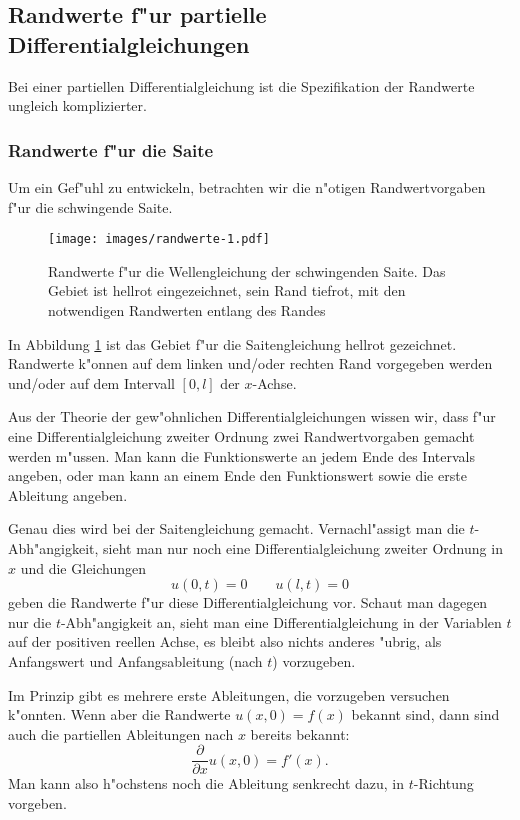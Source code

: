 \subsection{Randwerte f"ur partielle Differentialgleichungen\label{klassifikation:randwerte-pde}}
Bei einer partiellen Differentialgleichung ist die Spezifikation
der Randwerte ungleich komplizierter.
\subsubsection{Randwerte f"ur die Saite}
Um ein Gef"uhl zu entwickeln, betrachten wir die n"otigen
Randwertvorgaben f"ur die schwingende Saite.
\begin{figure}
\begin{center}
\texttt{[image: images/randwerte-1.pdf]}
\end{center}
\caption{Randwerte f"ur die Wellengleichung der schwingenden Saite.
Das Gebiet ist hellrot eingezeichnet, sein Rand tiefrot, mit den 
notwendigen Randwerten entlang des Randes\label{klassifikation:randwertesaite}}
\end{figure}
In Abbildung \ref{klassifikation:randwertesaite} ist das Gebiet f"ur
die Saitengleichung hellrot gezeichnet. Randwerte k"onnen auf dem
linken und/oder rechten Rand vorgegeben werden und/oder auf dem
Intervall $[0,l]$ der $x$-Achse.

Aus der Theorie der gew"ohnlichen Differentialgleichungen wissen wir,
dass f"ur eine Differentialgleichung zweiter Ordnung zwei Randwertvorgaben
gemacht werden m"ussen.
Man kann die Funktionswerte an jedem Ende des
Intervals angeben, oder man kann an einem Ende den Funktionswert
sowie die erste Ableitung angeben.

Genau dies wird bei der Saitengleichung gemacht. Vernachl"assigt man
die $t$-Abh"angigkeit, sieht man nur noch eine Differentialgleichung
zweiter Ordnung in $x$ und die Gleichungen 
\[
u(0,t)=0\qquad u(l,t)=0
\]
geben die Randwerte f"ur diese Differentialgleichung vor.
Schaut man dagegen nur die $t$-Abh"angigkeit an,
sieht man eine Differentialgleichung
in der Variablen $t$ auf der positiven reellen Achse, es bleibt also
nichts anderes "ubrig, als Anfangswert und Anfangsableitung (nach $t$)
vorzugeben.

Im Prinzip gibt es mehrere erste Ableitungen, die vorzugeben versuchen 
k"onnten. Wenn aber die Randwerte 
$ u(x,0)=f(x)$
bekannt sind, dann sind auch die partiellen Ableitungen nach $x$ bereits
bekannt:
\[
\frac{\partial }{\partial x}u(x,0)=f'(x).
\]
Man kann also h"ochstens noch die Ableitung senkrecht dazu,
in $t$-Richtung vorgeben.

